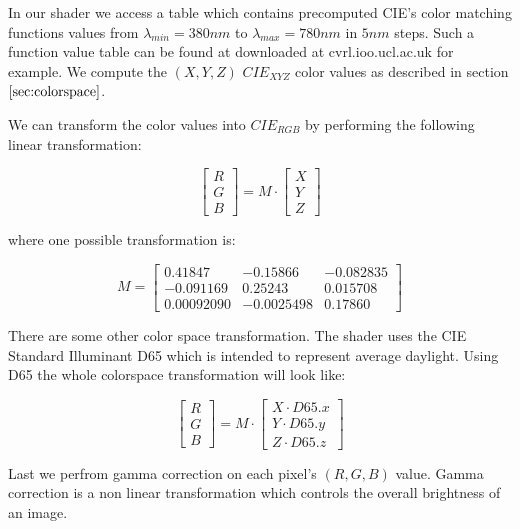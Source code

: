 In our shader we access a table which contains precomputed CIE's color matching functions values from $\lambda_{min} = 380 nm$ to $\lambda_{max} = 780 nm$ in $5 nm$ steps. Such a function value table can be found at downloaded at cvrl.ioo.ucl.ac.uk for example. We compute the $(X,Y,Z)$ $CIE_{XYZ}$ color values as described in section $\ref{sec:colorspace}$. 


We can transform the color values into $CIE_{RGB}$ by performing the following linear transformation:

\begin{equation}
\begin{bmatrix}R\\G\\B\end{bmatrix} = M \cdot \begin{bmatrix}X\\Y\\Z\end{bmatrix}
\end{equation} 

where one possible transformation is: 

\begin{equation}
M = \begin{bmatrix} 0.41847 & -0.15866 & -0.082835\\ -0.091169 & 0.25243 & 0.015708\\ 0.00092090 & -0.0025498 & 0.17860 \end{bmatrix}
\end{equation}

There are some other color space transformation. The shader uses the CIE Standard Illuminant D65 which is intended to represent average daylight. Using D65 the whole colorspace transformation will look like:

\begin{equation}
\begin{bmatrix}R\\G\\B\end{bmatrix} = M \cdot \begin{bmatrix}X \cdot D65.x \\ Y \cdot D65.y \\Z \cdot D65.z \end{bmatrix} 
\end{equation}

Last we perfrom gamma correction on each pixel's $(R,G,B)$ value. Gamma correction is a non linear transformation which controls the overall brightness of an image.

